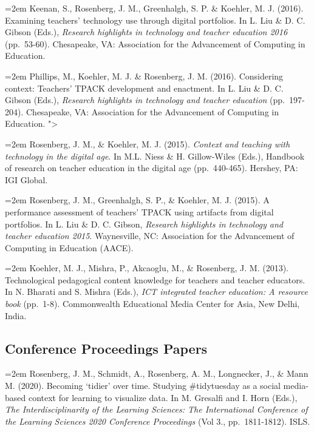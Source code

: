 \documentclass[
  14,
]{article}
\begin{document}
\hangindent=2em Keenan, S., Rosenberg, J. M., Greenhalgh, S. P. \&
Koehler, M. J. (2016). Examining teachers' technology use through
digital portfolios. In L. Liu \& D. C. Gibson (Eds.), \emph{Research
highlights in technology and teacher education 2016} (pp.~53-60).
Chesapeake, VA: Association for the Advancement of Computing in
Education.

\hangindent=2em Phillips, M., Koehler, M. J. \& Rosenberg, J. M. (2016).
Considering context: Teachers' TPACK development and enactment. In L.
Liu \& D. C. Gibson (Eds.), \emph{Research highlights in technology and
teacher education} (pp.~197-204). Chesapeake, VA: Association for the
Advancement of Computing in Education. "\textgreater{}

\hangindent=2em Rosenberg, J. M., \& Koehler, M. J. (2015).
\emph{Context and teaching with technology in the digital age}. In M.L.
Niess \& H. Gillow-Wiles (Eds.), Handbook of research on teacher
education in the digital age (pp.~440-465). Hershey, PA: IGI Global.

\hangindent=2em Rosenberg, J. M., Greenhalgh, S. P., \& Koehler, M. J.
(2015). A performance assessment of teachers' TPACK using artifacts from
digital portfolios. In L. Liu \& D. C. Gibson, \emph{Research highlights
in technology and teacher education 2015}. Waynesville, NC: Association
for the Advancement of Computing in Education (AACE).

\hangindent=2em Koehler, M. J., Mishra, P., Akcaoglu, M., \& Rosenberg,
J. M. (2013). Technological pedagogical content knowledge for teachers
and teacher educators. In N. Bharati and S. Mishra (Eds.), \emph{ICT
integrated teacher education: A resource book} (pp.~1-8). Commonwealth
Educational Media Center for Asia, New Delhi, India.

\hypertarget{conference-proceedings-papers}{%
\subsection{Conference Proceedings
Papers}\label{conference-proceedings-papers}}

\hangindent=2em Rosenberg, J. M., Schmidt, A., Rosenberg, A. M.,
Longnecker, J., \& Mann M. (2020). Becoming `tidier' over time. Studying
\#tidytuesday as a social media-based context for learning to visualize
data. In M. Gresalfi and I. Horn (Eds.), \emph{The Interdisciplinarity
of the Learning Sciences: The International Conference of the Learning
Sciences 2020 Conference Proceedings} (Vol 3., pp.~1811-1812). ISLS.
\end{document}
